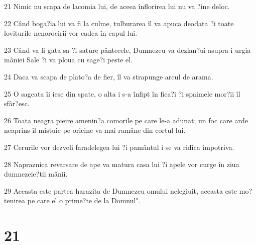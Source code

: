 \par 21 Nimic nu scapa de lacomia lui, de aceea înflorirea lui nu va ?ine deloc.
\par 22 Când boga?ia lui va fi la culme, tulburarea îl va apuca deodata ?i toate loviturile nenorocirii vor cadea în capul lui.
\par 23 Când va fi gata sa-?i sature pântecele, Dumnezeu va dezlan?ui asupra-i urgia mâniei Sale ?i va ploua cu sage?i peste el.
\par 24 Daca va scapa de plato?a de fier, îl va strapunge arcul de arama.
\par 25 O sageata îi iese din spate, o alta i s-a înfipt în fica?i ?i spaimele mor?ii îl sfâr?esc.
\par 26 Toata neagra pieire amenin?a comorile pe care le-a adunat; un foc care arde neaprins îl mistuie pe oricine va mai ramâne din cortul lui.
\par 27 Cerurile vor dezveli faradelegea lui ?i pamântul i se va ridica împotriva.
\par 28 Napraznica revarsare de ape va matura casa lui ?i apele vor curge în ziua dumnezeie?tii mânii.
\par 29 Aceasta este partea harazita de Dumnezeu omului nelegiuit, aceasta este mo?tenirea pe care el o prime?te de la Domnul".

\chapter{21}

